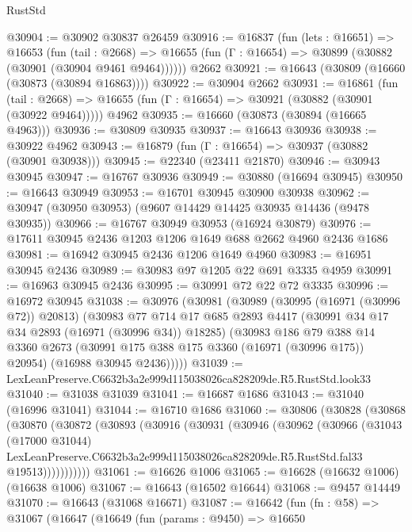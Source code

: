 \begin{lexlean}{RustStd}
\begin{coremodule}
@30904 := @30902 @30837 @26459
@30916 := @16837
    (fun (lets : @16651) =>
    @16653
      (fun (tail : @2668) =>
      @16655 (fun (Γ : @16654) => @30899 (@30882 (@30901 (@30904 @9461 @9464))))))
    @2662
@30921 := @16643 (@30809 (@16660 (@30873 (@30894 @16863))))
@30922 := @30904 @2662
@30931 := @16861
    (fun (tail : @2668) => @16655 (fun (Γ : @16654) => @30921 (@30882 (@30901 (@30922 @9464)))))
    @4962
@30935 := @16660 (@30873 (@30894 (@16665 @4963)))
@30936 := @30809 @30935
@30937 := @16643 @30936
@30938 := @30922 @4962
@30943 := @16879 (fun (Γ : @16654) => @30937 (@30882 (@30901 @30938)))
@30945 := @22340 (@23411 @21870)
@30946 := @30943 @30945
@30947 := @16767 @30936
@30949 := @30880 (@16694 @30945)
@30950 := @16643 @30949
@30953 := @16701 @30945 @30900 @30938
@30962 := @30947 (@30950 @30953) (@9607 @14429 @14425 @30935 @14436 (@9478 @30935))
@30966 := @16767 @30949 @30953 (@16924 @30879)
@30976 := @17611 @30945 @2436 @1203 @1206 @1649 @688 @2662 @4960 @2436 @1686
@30981 := @16942 @30945 @2436 @1206 @1649 @4960
@30983 := @16951 @30945 @2436
@30989 := @30983 @97 @1205 @22 @691 @3335 @4959
@30991 := @16963 @30945 @2436
@30995 := @30991 @72 @22 @72 @3335
@30996 := @16972 @30945
@31038 := @30976
    (@30981
      (@30989
        (@30995 (@16971 (@30996 @72)) @20813)
        (@30983
          @77
          @714
          @17
          @685
          @2893
          @4417
          (@30991 @34 @17 @34 @2893 (@16971 (@30996 @34)) @18285)
          (@30983
            @186
            @79
            @388
            @14
            @3360
            @2673
            (@30991 @175 @388 @175 @3360 (@16971 (@30996 @175)) @20954)
            (@16988 @30945 @2436)))))
@31039 := LexLeanPreserve.C6632b3a2e999d115038026ca828209de.R5.RustStd.look33
@31040 := @31038 @31039
@31041 := @16687 @1686
@31043 := @31040 (@16996 @31041)
@31044 := @16710 @1686
@31060 := @30806
    (@30828
      (@30868
        (@30870
          (@30872
            (@30893
              (@30916
                (@30931
                  (@30946
                    (@30962
                      (@30966
                        (@31043
                          (@17000 @31044)
                          LexLeanPreserve.C6632b3a2e999d115038026ca828209de.R5.RustStd.fal33
                          @19513)))))))))))
@31061 := @16626 @1006
@31065 := @16628 (@16632 @1006) (@16638 @1006)
@31067 := @16643 (@16502 @16644)
@31068 := @9457 @14449
@31070 := @16643 (@31068 @16671)
@31087 := @16642
    (fun (fn : @58) =>
    @31067
      (@16647
        (@16649
          (fun (params : @9450) =>
          @16650

\end{coremodule}
\end{lexlean}
